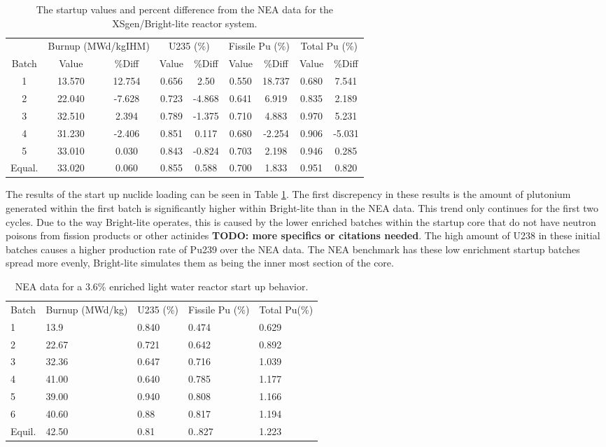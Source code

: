 \documentclass{article}
\newcommand{\TODO}[1] {{\color{red}\textbf{TODO: #1}}}
\begin{document}
\begin{table}[!htb]
\centering
\caption{The startup values and percent difference from the NEA data for the XSgen/Bright-lite reactor system.}
\label{tab:c}
\begin{tabular}{c cc | cc | cc | cc}
 & \multicolumn{2}{p{1cm}}{Burnup (MWd/kgIHM)} & \multicolumn{2}{c}{U235 (\%)} & \multicolumn{2}{c}{Fissile Pu (\%)} & \multicolumn{2}{c}{Total Pu (\%)} \\
Batch & Value & \%Diff & Value & \%Diff & Value & \%Diff & Value & \%Diff \\
1 & 13.570 & 12.754 & 0.656 & 2.50 & 0.550 & 18.737 & 0.680 & 7.541 \\
2 & 22.040 & -7.628 & 0.723 & -4.868 & 0.641 & 6.919 & 0.835 & 2.189 \\
3 & 32.510 & 2.394 & 0.789 & -1.375 & 0.710 & 4.883 & 0.970 & 5.231 \\
4 & 31.230 & -2.406 & 0.851 & 0.117 & 0.680 & -2.254 & 0.906 & -5.031 \\
5 & 33.010 & 0.030 & 0.843 & -0.824 & 0.703 & 2.198 & 0.946 & 0.285 \\
Equal. & 33.020 & 0.060 & 0.855 & 0.588 & 0.700 & 1.833 & 0.951 & 0.820
\end{tabular}
\end{table}

The results of the start up nuclide loading can be seen in Table \ref{tab:c}.
The first discrepency in these results is the amount of plutonium generated
within the first batch is significantly higher within Bright-lite than in the NEA data.
This trend only continues for the first two cycles. Due to the way Bright-lite operates,
this is caused by the lower enriched batches within the startup core that do not have
neutron poisons from fission products or other actinides \TODO{more specifics or citations
needed}.
The high amount of U238 in these initial batches causes a higher production rate of
Pu239 over the NEA data. The NEA benchmark has these low enrichment startup batches
spread more evenly, Bright-lite simulates them as being the inner most section of the core.

\begin{table}[!htb]
\centering
\caption{NEA data for a 3.6\% enriched light water reactor start up behavior.}
\label{tab:d}
\begin{tabular}{lllll}
Batch & Burnup (MWd/kg) & U235 (\%) & Fissile Pu (\%) & Total Pu(\%) \\
1 & 13.9 & 0.840 & 0.474 & 0.629 \\
2 & 22.67 & 0.721 & 0.642 & 0.892 \\
3 & 32.36 & 0.647 & 0.716 & 1.039 \\
4 & 41.00 & 0.640 & 0.785 & 1.177 \\
5 & 39.00 & 0.940 & 0.808 & 1.166 \\
6 & 40.60 & 0.88 & 0.817 & 1.194 \\
Equil. & 42.50 & 0.81 & 0..827 & 1.223
\end{tabular}
\end{table}
\end{document}

